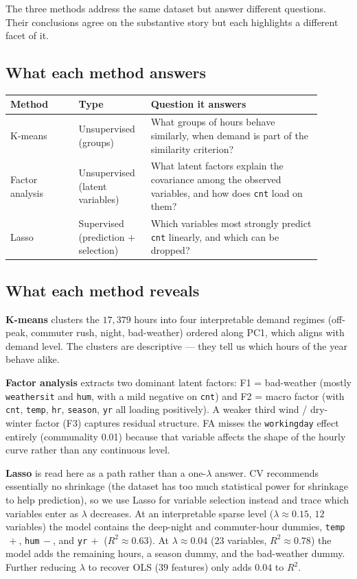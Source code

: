 \documentclass[11pt]{article}
\begin{document}
The three methods address the same dataset but answer different
questions. Their conclusions agree on the substantive story but
each highlights a different facet of it.

\subsection*{What each method answers}

\begin{center}
\begin{tabular}{p{0.20\linewidth} p{0.20\linewidth} p{0.50\linewidth}}
\toprule
\textbf{Method} & \textbf{Type} & \textbf{Question it answers} \\
\midrule
K-means & Unsupervised (groups) &
What groups of hours behave similarly, when demand is part of the
similarity criterion? \\
Factor analysis & Unsupervised (latent variables) &
What latent factors explain the covariance among the observed
variables, and how does \texttt{cnt} load on them? \\
Lasso & Supervised (prediction $+$ selection) &
Which variables most strongly predict \texttt{cnt} linearly, and
which can be dropped? \\
\bottomrule
\end{tabular}
\end{center}

\subsection*{What each method reveals}

\textbf{K-means} clusters the $17{,}379$ hours into four
interpretable demand regimes (off-peak, commuter rush, night,
bad-weather) ordered along PC1, which aligns with demand level.
The clusters are descriptive --- they tell us which hours of
the year behave alike.

\textbf{Factor analysis} extracts two dominant latent factors:
F1 = bad-weather (mostly \texttt{weathersit} and \texttt{hum},
with a mild negative on \texttt{cnt}) and F2 = macro factor (with \texttt{cnt}, \texttt{temp}, \texttt{hr},
\texttt{season}, \texttt{yr} all loading positively). A weaker
third wind / dry-winter factor (F3) captures residual
structure. FA misses the \texttt{workingday} effect entirely
(communality 0.01) because that variable affects the shape
of the hourly curve rather than any continuous level.

\textbf{Lasso} is read here as a path rather than a
one-$\lambda$ answer. CV recommends essentially no shrinkage
(the dataset has too much statistical power for shrinkage to help
prediction), so we use Lasso for variable selection instead and
trace which variables enter as $\lambda$ decreases. At an
interpretable sparse level ($\lambda \approx 0.15$, $12$
variables) the model contains the deep-night and commuter-hour
dummies, \texttt{temp}$\,+$, \texttt{hum}$\,-$, and
\texttt{yr}$\,+$ ($R^2 \approx 0.63$). At $\lambda \approx 0.04$
($23$ variables, $R^2 \approx 0.78$) the model adds the remaining
hours, a season dummy, and the bad-weather dummy. Further
reducing $\lambda$ to recover OLS ($39$ features) only adds
$0.04$ to $R^2$.
\end{document}

